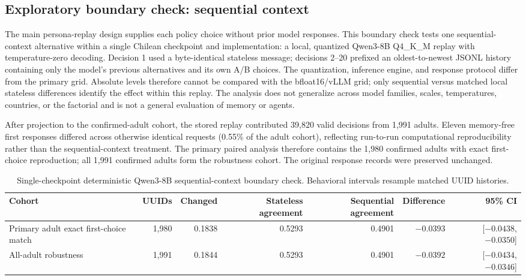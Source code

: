 \documentclass[unnumsec,webpdf,modern,large]{oup-authoring-template}
\begin{document}
\subsection{Exploratory boundary check: sequential context}

The main persona-replay design supplies each policy choice without prior model responses. This boundary check tests one sequential-context alternative within a single Chilean checkpoint and implementation: a local, quantized Qwen3-8B Q4\_K\_M replay with temperature-zero decoding. Decision 1 used a byte-identical stateless message; decisions 2--20 prefixed an oldest-to-newest JSONL history containing only the model's previous alternatives and its own A/B choices. The quantization, inference engine, and response protocol differ from the primary grid. Absolute levels therefore cannot be compared with the bfloat16/vLLM grid; only sequential versus matched local stateless differences identify the effect within this replay. The analysis does not generalize across model families, scales, temperatures, countries, or the factorial and is not a general evaluation of memory or agents.

After projection to the confirmed-adult cohort, the stored replay contributed 39,820 valid decisions from 1,991 adults. Eleven memory-free first responses differed across otherwise identical requests (0.55\% of the adult cohort), reflecting run-to-run computational reproducibility rather than the sequential-context treatment. The primary paired analysis therefore contains the 1,980 confirmed adults with exact first-choice reproduction; all 1,991 confirmed adults form the robustness cohort. The original response records were preserved unchanged.

\begin{table}[!b]
\caption{Single-checkpoint deterministic Qwen3-8B sequential-context boundary check. Behavioral intervals resample matched UUID histories.}
\label{tab:s_memory}
\centering
\small
\begin{tabular}{lrrrrrr}
\toprule
Cohort & UUIDs & Changed & Stateless agreement & Sequential agreement & Difference & 95\% CI \\
\midrule
Primary adult exact first-choice match & 1,980 & 0.1838 & 0.5293 & 0.4901 & $-0.0393$ & [$-0.0438$, $-0.0350$] \\
All-adult robustness & 1,991 & 0.1844 & 0.5293 & 0.4901 & $-0.0392$ & [$-0.0434$, $-0.0346$] \\
\bottomrule
\end{tabular}
\end{table}
\end{document}
